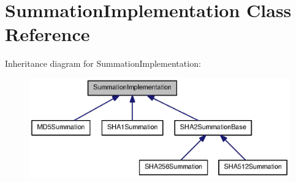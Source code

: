 \section{\-Summation\-Implementation \-Class \-Reference}
\label{classSummationImplementation}


\-Inheritance diagram for \-Summation\-Implementation\-:
\nopagebreak
\begin{figure}[H]
\begin{center}
\leavevmode
\includegraphics[width=350pt]{classSummationImplementation__inherit__graph}
\end{center}
\end{figure}
